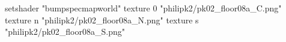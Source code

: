setshader "bumpspecmapworld"
    texture 0 "philipk2/pk02_floor08a_C.png"
    texture n "philipk2/pk02_floor08a_N.png"
    texture s "philipk2/pk02_floor08a_S.png"